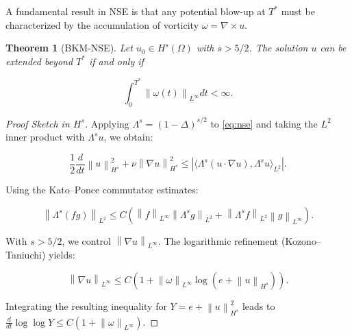 \documentclass[11pt,a4paper]{amsart}
\newtheorem{theorem}{Theorem}[section]
\newcommand{\norm}[1]{\left\|#1\right\|}
\newcommand{\abs}[1]{\left|#1\right|}
\newcommand{\inner}[2]{\langle #1, #2 \rangle}
\begin{document}
A fundamental result in NSE is that any potential blow-up at $T^*$ must be characterized by the accumulation of vorticity $\omega = \nabla \times u$.



\begin{theorem}[BKM-NSE]

Let $u_0 \in H^s(\Omega)$ with $s > 5/2$. The solution $u$ can be extended beyond $T^*$ if and only if

\begin{equation}

\int_0^{T^*} \norm{\omega(t)}_{L^\infty} dt < \infty.

\end{equation}

\end{theorem}



\begin{proof}[Proof Sketch in $H^s$]

Applying $\Lambda^s = (1-\Delta)^{s/2}$ to \eqref{eq:nse} and taking the $L^2$ inner product with $\Lambda^s u$, we obtain:

\begin{equation}

\frac{1}{2} \frac{d}{dt} \norm{u}_{H^s}^2 + \nu \norm{\nabla u}_{H^s}^2 \le \abs{\inner{\Lambda^s(u \cdot \nabla u)}{\Lambda^s u}_{L^2}}.

\end{equation}

Using the Kato--Ponce commutator estimates:

\begin{equation}

\norm{\Lambda^s(fg)}_{L^2} \le C (\norm{f}_{L^\infty} \norm{\Lambda^s g}_{L^2} + \norm{\Lambda^s f}_{L^2} \norm{g}_{L^\infty}).

\end{equation}

With $s > 5/2$, we control $\norm{\nabla u}_{L^\infty}$. The logarithmic refinement (Kozono--Taniuchi) yields:

\begin{equation}

\norm{\nabla u}_{L^\infty} \le C (1 + \norm{\omega}_{L^\infty} \log(e + \norm{u}_{H^s})).

\end{equation}

Integrating the resulting inequality for $Y = e + \norm{u}_{H^s}^2$ leads to $\frac{d}{dt} \log \log Y \le C(1 + \norm{\omega}_{L^\infty})$.

\end{proof}
\end{document}
